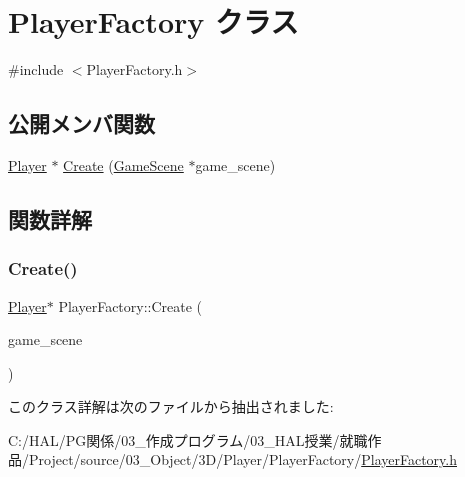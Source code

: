 \hypertarget{class_player_factory}{}\section{Player\+Factory クラス}
\label{class_player_factory}


{\ttfamily \#include $<$Player\+Factory.\+h$>$}

\subsection*{公開メンバ関数}
\begin{DoxyCompactItemize}
\item 
\mbox{\hyperlink{class_player}{Player}} $\ast$ \mbox{\hyperlink{class_player_factory_a7429328c81ec97fdaafb9eef756c0dba}{Create}} (\mbox{\hyperlink{class_game_scene}{Game\+Scene}} $\ast$game\+\_\+scene)
\end{DoxyCompactItemize}


\subsection{関数詳解}
\mbox{\label{class_player_factory_a7429328c81ec97fdaafb9eef756c0dba}} 
\subsubsection{\texorpdfstring{Create()}{Create()}}
{\footnotesize\ttfamily \mbox{\hyperlink{class_player}{Player}}$\ast$ Player\+Factory\+::\+Create (\begin{DoxyParamCaption}\item[{\mbox{\hyperlink{class_game_scene}{Game\+Scene}} $\ast$}]{game\+\_\+scene }\end{DoxyParamCaption})\hspace{0.3cm}{\ttfamily [inline]}}



このクラス詳解は次のファイルから抽出されました\+:\begin{DoxyCompactItemize}
\item 
C\+:/\+H\+A\+L/\+P\+G関係/03\+\_\+作成プログラム/03\+\_\+\+H\+A\+L授業/就職作品/\+Project/source/03\+\_\+\+Object/3\+D/\+Player/\+Player\+Factory/\mbox{\hyperlink{_player_factory_8h}{Player\+Factory.\+h}}\end{DoxyCompactItemize}
